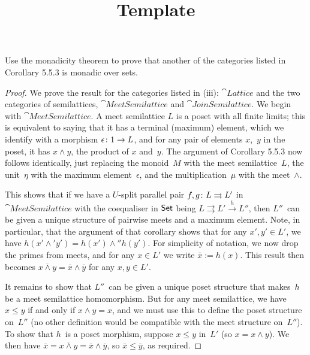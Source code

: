 \documentclass[../../solutions]{subfiles}
\title{Template}
\author{}
\begin{document}
\maketitle

%   

\begin{exercise}
  Use the monadicity theorem to prove that another of the categories
  listed in Corollary 5.5.3 is monadic over sets.
\end{exercise}

\begin{proof}
  We prove the result for the categories listed in (iii):
  $\cat{Lattice}$ and the two categories of semilattices,
  $\cat{MeetSemilattice}$ and $\cat{JoinSemilattice}$.  We begin with
  $\cat{MeetSemilattice}$.  A meet semilattice $L$ is a poset with all
  finite limits; this is equivalent to saying that it has a terminal
  (maximum) element, which we identify with a morphism
  ${\epsilon}\colon{1}\to{L}$, and for any pair of elements $x$,~$y$ in
  the poset, it has $x\wedge y$, the product of $x$ and~$y$.  The
  argument of Corollary 5.5.3 now follows identically, just replacing
  the monoid~$M$ with the meet semilattice~$L$, the unit~$\eta$ with
  the maximum element~$\epsilon$, and the multiplication~$\mu$ with
  the meet~$\wedge$.

  This shows that if we have a $U$-split parallel pair
  ${f,g}\colon{L}\rightrightarrows{L'}$ in $\cat{MeetSemilattice}$ with the coequaliser
  in $\mathsf{Set}$ being $L\rightrightarrows L' \xrightarrow{h} L''$, then
  $L''$~can be given a unique structure of pairwise meets and a
  maximum element.  Note, in particular, that the argument of that
  corollary shows that for any $x', y'\in L'$, we have
  $h(x'\wedge' y')=h(x')\wedge'' h(y')$.  For simplicity of notation,
  we now drop the primes from meets, and for any $x\in L'$ we write
  $\bar x:=h(x)$.  This result then becomes
  $\overline{x\wedge y}=\bar x\wedge \bar y$ for any $x,y\in L'$.

  It remains to show that $L''$~can be given a unique poset structure
  that makes~$h$ be a meet semilattice homomorphism.  But for any meet
  semilattice, we have $x\le y$ if and only if $x\wedge y=x$, and we
  must use this to define the poset structure on~$L''$ (no other
  definition would be compatible with the meet structure on~$L''$).
  To show that $h$~is a poset morphism, suppose $x\le y$ in~$L'$ (so
  $x=x\wedge y$).  We then have
  $\bar x=\overline{x\wedge y} = \bar x\wedge \bar y$, so
  $\bar x\le \bar y$, as required.


\end{proof}
\end{document}
